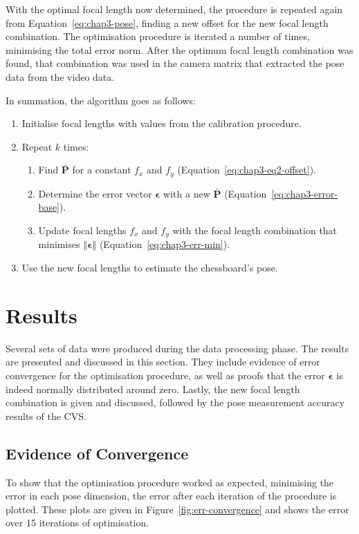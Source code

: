 With the optimal focal length now determined, the procedure is repeated again from Equation~\ref{eq:chap3-pose}, finding a new offset for the new focal length combination. The optimisation procedure is iterated a number of times, minimising the total error norm. After the optimum focal length combination was found, that combination was used in the camera matrix that extracted the pose data from the video data.

In summation, the algorithm goes as follows: 

\begin{enumerate}
  \item Initialise focal lengths with values from the calibration procedure. 
  \item Repeat $k$ times:
  \begin{enumerate}
    \item Find $\bar{\bm{P}}$ for a constant $f_x$ and $f_y$ (Equation~\ref{eq:chap3-eq2-offset}).
    \item Determine the error vector $\bm{\epsilon}$ with a new $\bar{\bm{P}}$ (Equation~\ref{eq:chap3-error-base}).
    \item Update focal lengths $f_x$ and $f_y$ with the focal length combination that minimises $\left \Vert \bm{\epsilon} \right \Vert$ (Equation~\ref{eq:chap3-err-min}).
  \end{enumerate}
  \item Use the new focal lengths to estimate the chessboard's pose.
\end{enumerate}

\section{Results}

Several sets of data were produced during the data processing phase. The results are presented and discussed in this section. They include evidence of error convergence for the optimisation procedure, as well as proofs that the error $\bm{\epsilon}$ is indeed normally distributed around zero. Lastly, the new focal length combination is given and discussed, followed by the pose measurement accuracy results of the CVS. 

\subsection{Evidence of Convergence}

To show that the optimisation procedure worked as expected, minimising the error in each pose dimension, the error after each iteration of the procedure is plotted. These plots are given in Figure~\ref{fig:err-convergence} and shows the error over 15 iterations of optimisation.  

